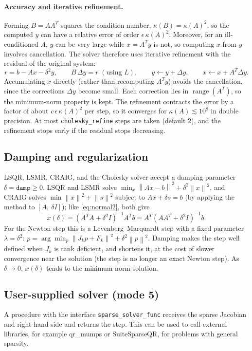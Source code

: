 \documentclass[11pt]{article}
\newcommand{\norm}[1]{\left\lVert #1 \right\rVert}
\newcommand{\code}[1]{\texttt{#1}}
\newcommand{\cond}{\kappa}
\DeclareMathOperator{\range}{range}
\begin{document}
\paragraph{Accuracy and iterative refinement.}
Forming $B = A A^T$ squares the condition number, $\cond(B) = \cond(A)^2$, so the computed $y$ can
have a relative error of order $\epsilon\, \cond(A)^2$. Moreover, for an ill-conditioned $A$, $y$ can be
very large while $x = A^T y$ is not, so computing $x$ from $y$ involves cancellation. The solver
therefore uses iterative refinement with the residual of the original system:
\begin{equation}
  r = b - A x - \delta^2 y, \qquad
  B\, \Delta y = r \;(\text{using } L), \qquad
  y \gets y + \Delta y, \qquad x \gets x + A^T \Delta y .
\end{equation}
Accumulating $x$ directly (rather than recomputing $A^T y$) avoids the cancellation, since the
corrections $\Delta y$ become small. Each correction lies in $\range(A^T)$, so the minimum-norm
property is kept. The refinement contracts the error by a factor of about $c\,\epsilon\,\cond(A)^2$ per
step, so it converges for $\cond(A) \lesssim 10^{8}$ in double precision. At most
\code{cholesky\_refine} steps are taken (default 2), and the refinement stops early if the residual
stops decreasing.

\subsection{Damping and regularization}
\label{sec:damping}
LSQR, LSMR, CRAIG, and the Cholesky solver accept a damping parameter $\delta = \code{damp} \ge 0$.
LSQR and LSMR solve $\min_x \norm{Ax - b}^2 + \delta^2 \norm{x}^2$, and CRAIG solves
$\min \norm{x}^2 + \norm{s}^2$ subject to $Ax + \delta s = b$ (by applying the method to
$[A,\ \delta I]$); like \cref{eq:normal2}, both give
\begin{equation}
  x(\delta) = (A^T A + \delta^2 I)^{-1} A^T b = A^T (A A^T + \delta^2 I)^{-1} b .
\end{equation}
For the Newton step this is a Levenberg--Marquardt step with a fixed parameter
$\lambda = \delta^2$: $p = \arg\min_p \norm{J_k p + F_k}^2 + \delta^2 \norm{p}^2$. Damping makes
the step well defined when $J_k$ is rank deficient, and shortens it, at the cost of slower
convergence near the solution (the step is no longer an exact Newton step). As $\delta \to 0$,
$x(\delta)$ tends to the minimum-norm solution.

\subsection{User-supplied solver (mode 5)}
A procedure with the interface \code{sparse\_solver\_func} receives the sparse Jacobian and
right-hand side and returns the step. This can be used to call external libraries, for example
qr\_mumps \cite{qrmumps} or SuiteSparseQR, for problems with general sparsity.
\end{document}
